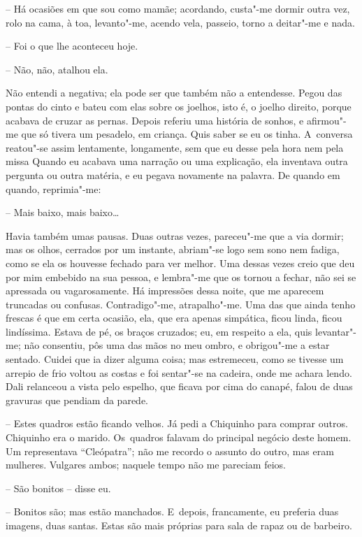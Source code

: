 -- Há ocasiões em que sou como mamãe; acordando, custa"-me dormir outra
vez, rolo na cama, à toa, levanto"-me, acendo vela, passeio, torno a
deitar"-me e nada.

-- Foi o que lhe aconteceu hoje.

-- Não, não, atalhou ela.

Não entendi a negativa; ela pode ser que também não a entendesse. Pegou
das pontas do cinto e bateu com elas sobre os joelhos, isto é, o joelho
direito, porque acabava de cruzar as pernas. Depois referiu uma história
de sonhos, e afirmou"-me que só tivera um pesadelo, em criança. Quis
saber se eu os tinha. A~conversa reatou"-se assim lentamente, longamente,
sem que eu desse pela hora nem pela missa Quando eu acabava uma narração
ou uma explicação, ela inventava outra pergunta ou outra matéria, e eu
pegava novamente na palavra. De quando em quando, reprimia"-me:

-- Mais baixo, mais baixo\ldots{}

Havia também umas pausas. Duas outras vezes, pareceu"-me que a via
dormir; mas os olhos, cerrados por um instante, abriam"-se logo sem sono
nem fadiga, como se ela os houvesse fechado para ver melhor. Uma dessas
vezes creio que deu por mim embebido na sua pessoa, e lembra"-me que os
tornou a fechar, não sei se apressada ou vagarosamente. Há impressões
dessa noite, que me aparecem truncadas ou confusas. Contradigo"-me,
atrapalho"-me. Uma das que ainda tenho frescas é que em certa ocasião,
ela, que era apenas simpática, ficou linda, ficou lindíssima. Estava de
pé, os braços cruzados; eu, em respeito a ela, quis levantar"-me; não
consentiu, pôs uma das mãos no meu ombro, e obrigou"-me a estar sentado.
Cuidei que ia dizer alguma coisa; mas estremeceu, como se tivesse um
arrepio de frio voltou as costas e foi sentar"-se na cadeira, onde me
achara lendo. Dali relanceou a vista pelo espelho, que ficava por cima
do canapé, falou de duas gravuras que pendiam da parede.

-- Estes quadros estão ficando velhos. Já pedi a Chiquinho para comprar
outros. Chiquinho era o marido. Os~quadros falavam do principal negócio
deste homem. Um representava ``Cleópatra''; não me recordo o assunto do
outro, mas eram mulheres. Vulgares ambos; naquele tempo não me pareciam
feios.

-- São bonitos -- disse eu.

-- Bonitos são; mas estão manchados. E~depois, francamente, eu preferia
duas imagens, duas santas. Estas são mais próprias para sala de rapaz ou
de barbeiro.

